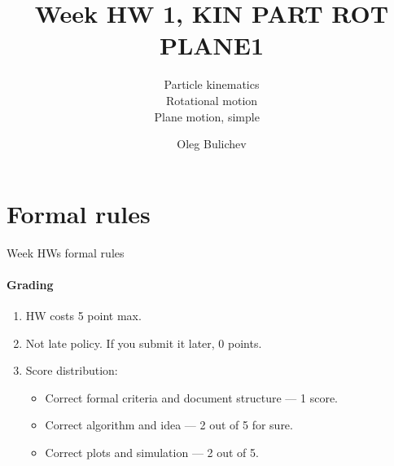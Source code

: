 \documentclass[aspectratio=169]{beamer}
\title[Theoretical Mechanics]{Week HW 1, KIN PART ROT PLANE1} %
\subtitle{ Particle kinematics \\
Rotational motion \\ Plane motion, simple \
         } %
\author{Oleg Bulichev}
\newcommand{\fbckg}[1]{\usebackgroundtemplate{\texttt{[image: \#1]}}}%
\begin{document}
\setlength{\abovedisplayskip}{0pt}
\setlength{\belowdisplayskip}{0pt}
\setlength{\abovedisplayshortskip}{0pt}
\setlength{\belowdisplayshortskip}{0pt}

\fbckg{fibeamer/figs/title_page.png}

\fbckg{fibeamer/figs/common.png}

\section*{Formal rules}

\begin{frame}[t]{Week HWs formal rules}
    \framesubtitle{Grading}
    \begin{enumerate}
        \footnotesize
        \item HW costs 5 point max.
        \item Not late policy. If you submit it later, 0 points.
        \item Score distribution:
        \begin{itemize}
            \footnotesize
            \item Correct formal criteria and document structure --- 1 score.
            \item Correct algorithm and idea --- 2 out of 5 for sure.
            \item Correct plots and simulation --- 2 out of 5.
        \end{itemize}
    \end{enumerate}
    \end{frame}
\end{document}
